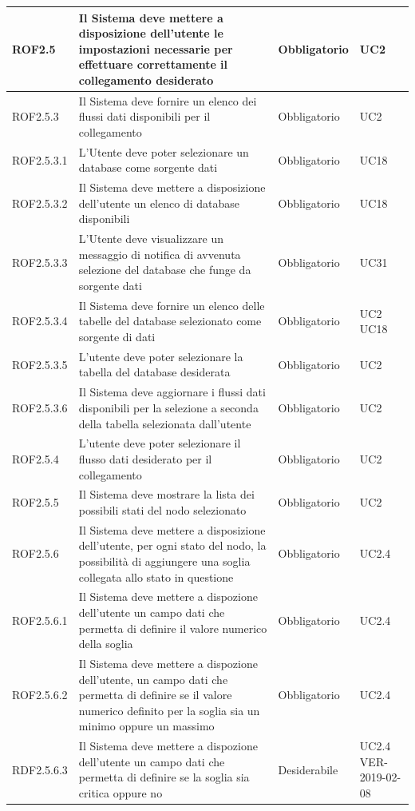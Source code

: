 \begin{center}
\begin{longtable}[c]{|m{}|m{}|m{}|m{}|}
\hline
ROF2.5 & Il Sistema deve mettere a disposizione dell'utente le impostazioni necessarie per effettuare correttamente il collegamento desiderato & Obbligatorio & UC2\\
\hline
\rowcolor{grigio}ROF2.5.3 & Il Sistema deve fornire un elenco dei flussi dati disponibili per il collegamento & Obbligatorio & UC2\\
\hline
ROF2.5.3.1 & L'Utente deve poter selezionare un database come sorgente dati & Obbligatorio & UC18\\
\hline
\rowcolor{grigio}ROF2.5.3.2 & Il Sistema deve mettere a disposizione dell'utente un elenco di database disponibili & Obbligatorio & UC18\\
\hline
ROF2.5.3.3 & L'Utente deve visualizzare un messaggio di notifica di avvenuta selezione del database che funge da sorgente dati & Obbligatorio & UC31\\
\hline
\rowcolor{grigio}ROF2.5.3.4 & Il Sistema deve fornire un elenco delle tabelle del database selezionato come sorgente di dati & Obbligatorio & UC2 UC18\\
\hline
ROF2.5.3.5 & L'utente deve poter selezionare la tabella del database desiderata & Obbligatorio & UC2\\
\hline
\rowcolor{grigio}ROF2.5.3.6 & Il Sistema deve aggiornare i flussi dati disponibili per la selezione a seconda della tabella selezionata dall'utente & Obbligatorio & UC2\\
\hline
ROF2.5.4 & L'utente deve poter selezionare il flusso dati desiderato per il collegamento & Obbligatorio & UC2\\
\hline
\rowcolor{grigio}ROF2.5.5 & Il Sistema deve mostrare la lista dei possibili stati del nodo selezionato & Obbligatorio & UC2\\
\hline
ROF2.5.6 & Il Sistema deve mettere a disposizione dell'utente, per ogni stato del nodo, la possibilità di aggiungere una soglia collegata allo stato in questione & Obbligatorio & UC2.4\\
\hline
\rowcolor{grigio}ROF2.5.6.1 & Il Sistema deve mettere a dispozione dell'utente un campo dati che permetta di definire il valore numerico della soglia & Obbligatorio & UC2.4\\
\hline
ROF2.5.6.2 & Il Sistema deve mettere a dispozione dell'utente, un campo dati che permetta di definire se il valore numerico definito per la soglia sia un minimo oppure un massimo & Obbligatorio & UC2.4\\
\hline
\rowcolor{grigio}RDF2.5.6.3 & Il Sistema deve mettere a dispozione dell'utente un campo dati che permetta di definire se la soglia sia critica oppure no & Desiderabile & UC2.4 VER-2019-02-08\\

\end{longtable}
\end{center}
